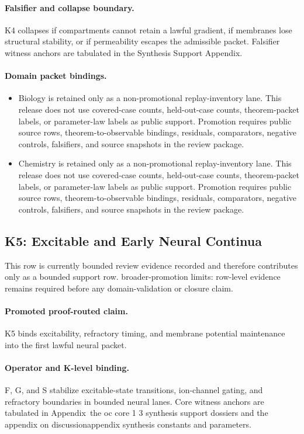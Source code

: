 \paragraph{Falsifier and collapse boundary.}
K4 collapses if compartments cannot retain a lawful gradient, if membranes lose structural stability, or if permeability escapes the admissible packet.
Falsifier witness anchors are tabulated in the Synthesis Support Appendix.

\paragraph{Domain packet bindings.}
\begin{itemize}[leftmargin=1.6em,nosep]
\item Biology is retained only as a non-promotional replay-inventory lane. This release does not use covered-case counts, held-out-case counts, theorem-packet labels, or parameter-law labels as public support. Promotion requires public source rows, theorem-to-observable bindings, residuals, comparators, negative controls, falsifiers, and source snapshots in the review package.
\item Chemistry is retained only as a non-promotional replay-inventory lane. This release does not use covered-case counts, held-out-case counts, theorem-packet labels, or parameter-law labels as public support. Promotion requires public source rows, theorem-to-observable bindings, residuals, comparators, negative controls, falsifiers, and source snapshots in the review package.
\end{itemize}

\subsection{K5: Excitable and Early Neural Continua}
\label{sec:oc-core-1-3-synthesis-k5}
This row is currently bounded review evidence recorded and therefore contributes only as a bounded support row.
broader-promotion limits: row-level evidence remains required before any domain-validation or closure claim.

\paragraph{Promoted proof-routed claim.}
K5 binds excitability, refractory timing, and membrane potential maintenance into the first lawful neural packet.

\paragraph{Operator and K-level binding.}
F, G, and S stabilize excitable-state transitions, ion-channel gating, and refractory boundaries in bounded neural lanes.
Core witness anchors are tabulated in Appendix~the oc core 1 3 synthesis support dossiers and the appendix on discussionappendix synthesis constants and parameters.

